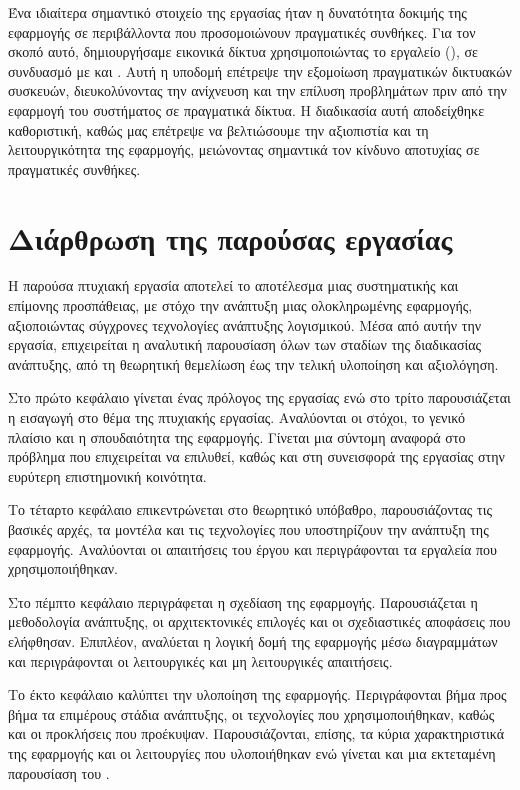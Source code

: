 Ένα ιδιαίτερα σημαντικό στοιχείο της εργασίας ήταν η δυνατότητα 
δοκιμής της εφαρμογής σε περιβάλλοντα που προσομοιώνουν 
πραγματικές συνθήκες. Για τον σκοπό αυτό, δημιουργήσαμε εικονικά 
δίκτυα χρησιμοποιώντας το εργαλείο  (), 
σε συνδυασμό με  και . 
Αυτή η υποδομή επέτρεψε την εξομοίωση πραγματικών δικτυακών 
συσκευών, διευκολύνοντας την ανίχνευση και την επίλυση 
προβλημάτων πριν από την εφαρμογή του συστήματος σε πραγματικά δίκτυα. 
Η διαδικασία αυτή αποδείχθηκε καθοριστική, καθώς μας επέτρεψε να βελτιώσουμε την αξιοπιστία και τη λειτουργικότητα της εφαρμογής, μειώνοντας σημαντικά τον κίνδυνο αποτυχίας σε πραγματικές συνθήκες.


\section{Διάρθρωση της παρούσας εργασίας}

Η παρούσα πτυχιακή εργασία αποτελεί το αποτέλεσμα μιας συστηματικής και επίμονης προσπάθειας, με στόχο την ανάπτυξη μιας ολοκληρωμένης εφαρμογής, αξιοποιώντας σύγχρονες τεχνολογίες ανάπτυξης λογισμικού. Μέσα από αυτήν την εργασία, επιχειρείται η αναλυτική παρουσίαση όλων των σταδίων της διαδικασίας ανάπτυξης, από τη θεωρητική θεμελίωση έως την τελική υλοποίηση και αξιολόγηση.

Στο πρώτο κεφάλαιο γίνεται ένας πρόλογος της εργασίας ενώ στο τρίτο παρουσιάζεται η εισαγωγή στο θέμα της πτυχιακής εργασίας. Αναλύονται οι στόχοι, το γενικό πλαίσιο και η σπουδαιότητα της εφαρμογής. Γίνεται μια σύντομη αναφορά στο πρόβλημα που επιχειρείται να επιλυθεί, καθώς και στη συνεισφορά της εργασίας στην ευρύτερη επιστημονική κοινότητα.

Το τέταρτο κεφάλαιο επικεντρώνεται στο θεωρητικό υπόβαθρο, παρουσιάζοντας τις βασικές αρχές, τα μοντέλα και τις τεχνολογίες που υποστηρίζουν την ανάπτυξη της εφαρμογής. Αναλύονται οι απαιτήσεις του έργου και περιγράφονται τα εργαλεία που χρησιμοποιήθηκαν.

Στο πέμπτο κεφάλαιο περιγράφεται η σχεδίαση της εφαρμογής. Παρουσιάζεται η μεθοδολογία ανάπτυξης, οι αρχιτεκτονικές επιλογές και οι σχεδιαστικές αποφάσεις που ελήφθησαν. Επιπλέον, αναλύεται η λογική δομή της εφαρμογής μέσω διαγραμμάτων και περιγράφονται οι λειτουργικές και μη λειτουργικές απαιτήσεις.

Το έκτο κεφάλαιο καλύπτει την υλοποίηση της εφαρμογής. Περιγράφονται βήμα προς βήμα τα επιμέρους στάδια ανάπτυξης, οι τεχνολογίες που χρησιμοποιήθηκαν, καθώς και οι προκλήσεις που προέκυψαν. Παρουσιάζονται, επίσης, τα κύρια χαρακτηριστικά της εφαρμογής και οι λειτουργίες που υλοποιήθηκαν ενώ γίνεται και μια εκτεταμένη παρουσίαση του .

